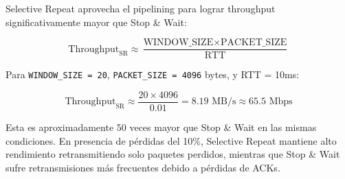 Selective Repeat aprovecha el pipelining para lograr throughput significativamente mayor que Stop \& Wait:

\[
\text{Throughput}_{\text{SR}} \approx \frac{\text{WINDOW\_SIZE} \times \text{PACKET\_SIZE}}{\text{RTT}}
\]

Para \texttt{WINDOW\_SIZE = 20}, \texttt{PACKET\_SIZE = 4096} bytes, y RTT = 10ms:

\[
\text{Throughput}_{\text{SR}} \approx \frac{20 \times 4096}{0.01} = 8.19 \text{ MB/s} \approx 65.5 \text{ Mbps}
\]

Esta es aproximadamente 50 veces mayor que Stop \& Wait en las mismas condiciones. En presencia de pérdidas del 10\%, Selective Repeat mantiene alto rendimiento retransmitiendo solo paquetes perdidos, mientras que Stop \& Wait sufre retransmisiones más frecuentes debido a pérdidas de ACKs.
 